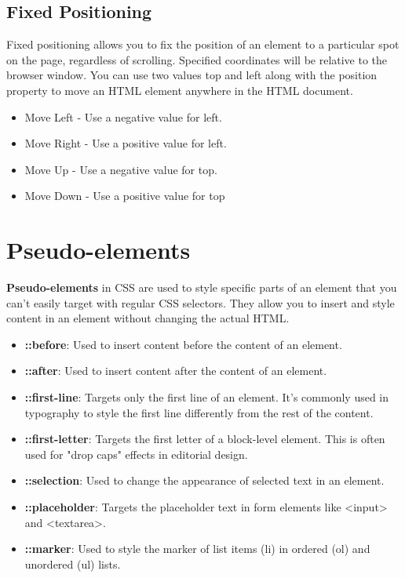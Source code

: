 \documentclass{report}
\begin{document}
    \subsection{Fixed Positioning}
    \bigbreak \noindent 
    Fixed positioning allows you to fix the position of an element to a particular spot
    on the page, regardless of scrolling. Specified coordinates will be relative to the
    browser window.
    \bigbreak \noindent 
    You can use two values top and left along with the position property to move an
    HTML element anywhere in the HTML document.
    \begin{itemize}
        \item Move Left - Use a negative value for left.
        \item Move Right - Use a positive value for left.
        \item Move Up - Use a negative value for top.
        \item Move Down - Use a positive value for top
    \end{itemize}
    \bigbreak \noindent 
    \bigbreak \noindent 

    \pagebreak \bigbreak \noindent 
    \section{\LARGE Pseudo-elements}
    \bigbreak \noindent 
    \textbf{Pseudo-elements} in CSS are used to style specific parts of an element that you can't easily target with regular CSS selectors. They allow you to insert and style content in an element without changing the actual HTML.
    \begin{itemize}
        \item \textbf{::before}: Used to insert content before the content of an element.
        \item \textbf{::after}: Used to insert content after the content of an element.
        \item \textbf{::first-line}: Targets only the first line of an element. It's commonly used in typography to style the first line differently from the rest of the content.
        \item \textbf{::first-letter}: Targets the first letter of a block-level element. This is often used for "drop caps" effects in editorial design.
        \item \textbf{::selection}: Used to change the appearance of selected text in an element.
        \item \textbf{::placeholder}: Targets the placeholder text in form elements like <input> and <textarea>.
        \item \textbf{::marker}: Used to style the marker of list items (li) in ordered (ol) and unordered (ul) lists.
    \end{itemize}
\end{document}
